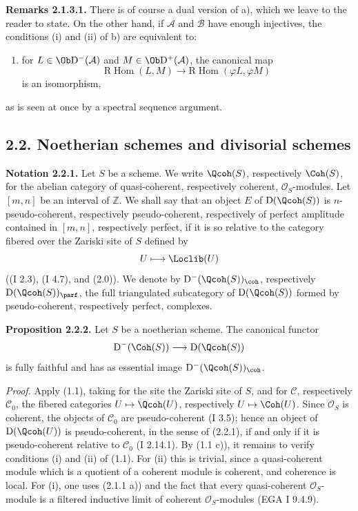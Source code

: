 \textbf{Remarks 2.1.3.1.} There is of course a dual version of a), which we leave to the reader to state. On the other hand, if $\mathcal A$ and $\mathcal B$ have enough injectives, the conditions (i) and (ii) of b) are equivalent to:
\begin{enumerate}[label=(\roman*),start=3]
\item for $L\in\Ob\mathrm D^{-}(\mathcal A)$ and $M\in\Ob\mathrm D^{+}(\mathcal A)$, the canonical map
\[
\mathrm R\!\operatorname{Hom}(L,M)\longrightarrow
\mathrm R\!\operatorname{Hom}(\varphi L,\varphi M)
\]
is an isomorphism,
\end{enumerate}
as is seen at once by a spectral sequence argument.

\subsection*{2.2. Noetherian schemes and divisorial schemes}

\textbf{Notation 2.2.1.} Let $S$ be a scheme. We write $\Qcoh(S)$, respectively $\Coh(S)$, for the abelian category of quasi-coherent, respectively coherent, $\mathcal O_S$-modules. Let $[m,n]$ be an interval of $\mathbb Z$. We shall say that an object $E$ of $\mathrm D(\Qcoh(S))$ is $n$-pseudo-coherent, respectively pseudo-coherent, respectively of perfect amplitude contained in $[m,n]$, respectively perfect, if it is so relative to the category fibered over the Zariski site of $S$ defined by
\[
U\longmapsto \Loclib(U)
\]
((I 2.3), (I 4.7), and (2.0)). We denote by $\mathrm D^{-}(\Qcoh(S))_{\coh}$, respectively $\mathrm D(\Qcoh(S))_{\parf}$, the full triangulated subcategory of $\mathrm D(\Qcoh(S))$ formed by pseudo-coherent, respectively perfect, complexes.

\textbf{Proposition 2.2.2.} Let $S$ be a noetherian scheme. The canonical functor
\[
\mathrm D^{-}(\Coh(S))\longrightarrow \mathrm D(\Qcoh(S))
\]
is fully faithful and has as essential image $\mathrm D^{-}(\Qcoh(S))_{\coh}$.

\emph{Proof.} Apply (1.1), taking for the site the Zariski site of $S$, and for $\mathcal C$, respectively $\mathcal C_0$, the fibered categories $U\mapsto\Qcoh(U)$, respectively $U\mapsto\Coh(U)$. Since $\mathcal O_S$ is coherent, the objects of $\mathcal C_0$ are pseudo-coherent (I 3.5); hence an object of $\mathrm D(\Qcoh(U))$ is pseudo-coherent, in the sense of (2.2.1), if and only if it is pseudo-coherent relative to $\mathcal C_0$ (I 2.14.1). By (1.1 c)), it remains to verify conditions (i) and (ii) of (1.1). For (ii) this is trivial, since a quasi-coherent module which is a quotient of a coherent module is coherent, and coherence is local. For (i), one uses (2.1.1 a)) and the fact that every quasi-coherent $\mathcal O_S$-module is a filtered inductive limit of coherent $\mathcal O_S$-modules (EGA I 9.4.9).

